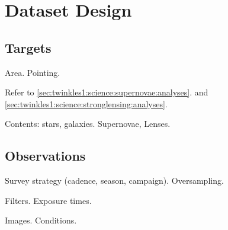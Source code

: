 \section{Dataset Design}
\label{sec:twinkles1:design}



\subsection{Targets}

Area. Pointing.

Refer to \autoref{sec:twinkles1:science:supernovae:analyses}.
and \autoref{sec:twinkles1:science:stronglensing:analyses}.

Contents: stars, galaxies. Supernovae, Lenses.


\subsection{Observations}

Survey strategy (cadence, season, campaign). Oversampling.

Filters. Exposure times.

Images. Conditions.


